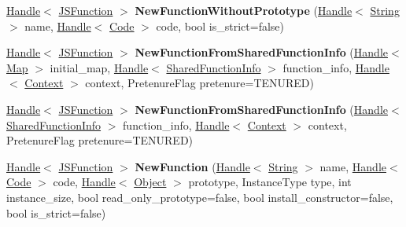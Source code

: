 \begin{DoxyCompactItemize}
\item 
\hyperlink{classv8_1_1internal_1_1_handle}{Handle}$<$ \hyperlink{classv8_1_1internal_1_1_j_s_function}{J\+S\+Function} $>$ {\bfseries New\+Function\+Without\+Prototype} (\hyperlink{classv8_1_1internal_1_1_handle}{Handle}$<$ \hyperlink{classv8_1_1internal_1_1_string}{String} $>$ name, \hyperlink{classv8_1_1internal_1_1_handle}{Handle}$<$ \hyperlink{classv8_1_1internal_1_1_code}{Code} $>$ code, bool is\+\_\+strict=false)\hypertarget{classv8_1_1internal_1_1_factory_aced732bf350b5014ca1ea7e04741afd5}{}\label{classv8_1_1internal_1_1_factory_aced732bf350b5014ca1ea7e04741afd5}

\item 
\hyperlink{classv8_1_1internal_1_1_handle}{Handle}$<$ \hyperlink{classv8_1_1internal_1_1_j_s_function}{J\+S\+Function} $>$ {\bfseries New\+Function\+From\+Shared\+Function\+Info} (\hyperlink{classv8_1_1internal_1_1_handle}{Handle}$<$ \hyperlink{classv8_1_1internal_1_1_map}{Map} $>$ initial\+\_\+map, \hyperlink{classv8_1_1internal_1_1_handle}{Handle}$<$ \hyperlink{classv8_1_1internal_1_1_shared_function_info}{Shared\+Function\+Info} $>$ function\+\_\+info, \hyperlink{classv8_1_1internal_1_1_handle}{Handle}$<$ \hyperlink{classv8_1_1internal_1_1_context}{Context} $>$ context, Pretenure\+Flag pretenure=T\+E\+N\+U\+R\+ED)\hypertarget{classv8_1_1internal_1_1_factory_aa5db3d493ee371439d9480157940a49d}{}\label{classv8_1_1internal_1_1_factory_aa5db3d493ee371439d9480157940a49d}

\item 
\hyperlink{classv8_1_1internal_1_1_handle}{Handle}$<$ \hyperlink{classv8_1_1internal_1_1_j_s_function}{J\+S\+Function} $>$ {\bfseries New\+Function\+From\+Shared\+Function\+Info} (\hyperlink{classv8_1_1internal_1_1_handle}{Handle}$<$ \hyperlink{classv8_1_1internal_1_1_shared_function_info}{Shared\+Function\+Info} $>$ function\+\_\+info, \hyperlink{classv8_1_1internal_1_1_handle}{Handle}$<$ \hyperlink{classv8_1_1internal_1_1_context}{Context} $>$ context, Pretenure\+Flag pretenure=T\+E\+N\+U\+R\+ED)\hypertarget{classv8_1_1internal_1_1_factory_a4342eb2c22667e1fe12be30a09c136ec}{}\label{classv8_1_1internal_1_1_factory_a4342eb2c22667e1fe12be30a09c136ec}

\item 
\hyperlink{classv8_1_1internal_1_1_handle}{Handle}$<$ \hyperlink{classv8_1_1internal_1_1_j_s_function}{J\+S\+Function} $>$ {\bfseries New\+Function} (\hyperlink{classv8_1_1internal_1_1_handle}{Handle}$<$ \hyperlink{classv8_1_1internal_1_1_string}{String} $>$ name, \hyperlink{classv8_1_1internal_1_1_handle}{Handle}$<$ \hyperlink{classv8_1_1internal_1_1_code}{Code} $>$ code, \hyperlink{classv8_1_1internal_1_1_handle}{Handle}$<$ \hyperlink{classv8_1_1internal_1_1_object}{Object} $>$ prototype, Instance\+Type type, int instance\+\_\+size, bool read\+\_\+only\+\_\+prototype=false, bool install\+\_\+constructor=false, bool is\+\_\+strict=false)\hypertarget{classv8_1_1internal_1_1_factory_ab7b1bd1081b2772c16a63be44d61d707}{}\label{classv8_1_1internal_1_1_factory_ab7b1bd1081b2772c16a63be44d61d707}


\end{DoxyCompactItemize}
